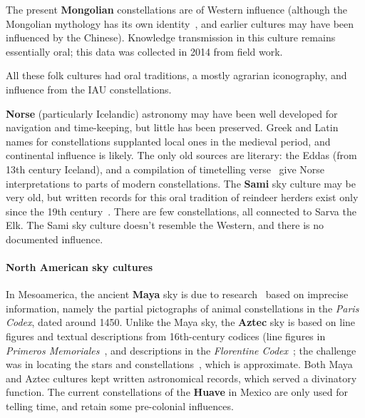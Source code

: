 \documentclass[10pt]{article}
\begin{document}
The present {\bf Mongolian} constellations are of Western influence (although the Mongolian mythology has its own identity~\cite{Stellarium}, and earlier cultures may have been influenced by the Chinese). Knowledge transmission in this culture remains essentially oral; this data was collected in 2014 from field work.

All these folk cultures had oral traditions, a mostly agrarian iconography, and influence from the IAU constellations.

{\bf Norse} (particularly Icelandic) astronomy may have been well developed for navigation and time-keeping, but little has been preserved. Greek and Latin names for constellations supplanted local ones in the medieval period, and continental influence is likely. The only old sources are literary: the Eddas (from 13th century Iceland), and a compilation of timetelling verse~\cite{kaalund1908alfraedhi} give Norse interpretations to parts of modern constellations. The {\bf Sami} sky culture may be very old, but written records for this oral tradition of reindeer herders exist only since the 19th century~\cite{Lundmark1982bmn}. There are few constellations, all connected to Sarva the Elk. The Sami sky culture doesn't resemble the Western, and there is no documented influence.

\paragraph{North American sky cultures} In Mesoamerica, the ancient {\bf Maya} sky is due to research~\cite{freidel1993maya,spotak2015maya} based on imprecise information, namely the partial pictographs of animal constellations in the \textit{Paris Codex}, dated around 1450. Unlike the Maya sky, the {\bf Aztec} sky is based on line figures and textual descriptions from 16th-century codices (line figures in \textit{Primeros Memoriales}~\cite{PrimerosMemoriales}, and descriptions in the \textit{Florentine Codex}~\cite{FlorentineCodex}; the challenge was in locating the stars and constellations~\cite{aveni1980skywatchers}, which is approximate. Both Maya and Aztec cultures kept written astronomical records, which served a divinatory function. The current constellations of the {\bf Huave} in Mexico are only used for telling time, and retain some pre-colonial influences. 
\end{document}
